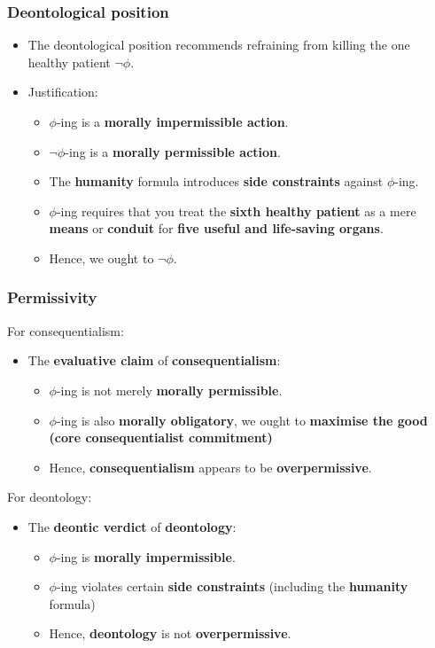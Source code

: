 \documentclass[11pt]{article}
\begin{document}
 \newpage
\subsubsection{Deontological position}
\label{sec:org6b6f6cc}
\begin{itemize}
\item The deontological position recommends refraining from killing the one healthy patient \(\neg \phi\).
\item Justification:
\begin{itemize}
\item \(\phi\)-ing is a \textbf{morally impermissible action}.
\item \(\neg \phi\)-ing is a \textbf{morally permissible action}.
\item The \textbf{humanity} formula introduces \textbf{side constraints} against \(\phi\)-ing.
\item \(\phi\)-ing requires that you treat the \textbf{sixth healthy patient} as a mere \textbf{means} or \textbf{conduit} for \textbf{five useful and life-saving organs}.
\item Hence, we ought to \(\neg \phi\).
\end{itemize}
\end{itemize}
\subsubsection{Permissivity}
\label{sec:org81cd890}
For consequentialism:
\begin{itemize}
\item The \textbf{evaluative claim} of \textbf{consequentialism}:
\begin{itemize}
\item \(\phi\)-ing is not merely \textbf{morally permissible}.
\item \(\phi\)-ing is also \textbf{morally obligatory}, we ought to \textbf{maximise the good (core consequentialist commitment)}
\item Hence, \textbf{consequentialism} appears to be \textbf{overpermissive}.
\end{itemize}
\end{itemize}

For deontology:
\begin{itemize}
\item The \textbf{deontic verdict} of \textbf{deontology}:
\begin{itemize}
\item \(\phi\)-ing is \textbf{morally impermissible}.
\item \(\phi\)-ing violates certain \textbf{side constraints} (including the \textbf{humanity} formula)
\item Hence, \textbf{deontology} is not \textbf{overpermissive}.
\end{itemize}
\end{itemize}
\end{document}
